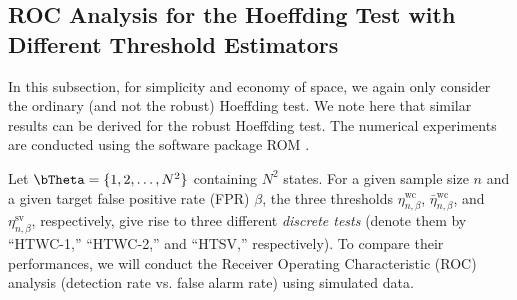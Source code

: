 \documentclass[10pt, twocolumn]{IEEEtran}
\begin{document}
\subsection{ROC Analysis for the Hoeffding Test with 
Different Threshold Estimators} \label{sec:ROCHoeff}

In this subsection, for simplicity and economy of space, we again only consider the ordinary (and not the robust) Hoeffding test. We note here that similar results can be derived for the robust Hoeffding test. The numerical experiments are conducted using the software package ROM \cite{ROCHM}.

Let ${\bTheta} = \{1,2,\ldots,N^2\}$ containing $N^2$
states. For a given sample size $n$ and a given target false positive rate (FPR) $\beta$, the
three thresholds $\eta_{n,\beta}^{\text{wc}}$, $\bar \eta_{n,\beta}^{\text{wc}}$, and $\eta_{n,\beta}^{\text{sv}}$, respectively, give rise
to three different \emph{discrete tests} (denote them by ``HTWC-1,'' ``HTWC-2,'' and ``HTSV,''
respectively). To compare their performances, we will conduct the Receiver
Operating Characteristic (ROC) \cite{fawcett2006introduction} analysis (detection rate vs. false alarm
rate) using simulated data.


	
\end{document}
